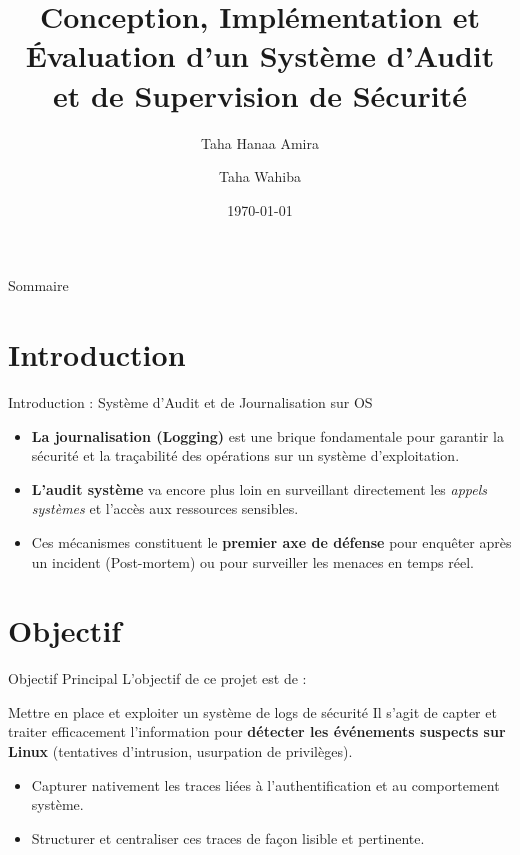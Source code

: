 \documentclass[10pt]{beamer}
\title[Système d'Audit et Journalisation]{Conception, Implémentation et Évaluation d'un Système d’Audit et de Supervision de Sécurité}
\author[Taha H.A. \& Taha W.]{Taha Hanaa Amira \and Taha Wahiba}
\institute[ING4 SECI]{ING4 SECI}
\date{\today}
\begin{document}
\begin{frame}
    \titlepage
\end{frame}

\begin{frame}{Sommaire}
    \tableofcontents
\end{frame}

\section{Introduction}
\begin{frame}{Introduction : Système d’Audit et de Journalisation sur OS}
    \begin{itemize}
        \item \textbf{La journalisation (Logging)} est une brique fondamentale pour garantir la sécurité et la traçabilité des opérations sur un système d'exploitation.
        \item \textbf{L'audit système} va encore plus loin en surveillant directement les \textit{appels systèmes} et l'accès aux ressources sensibles.
        \item Ces mécanismes constituent le \textbf{premier axe de défense} pour enquêter après un incident (Post-mortem) ou pour surveiller les menaces en temps réel.
    \end{itemize}
\end{frame}

\section{Objectif}
\begin{frame}{Objectif Principal}
    L'objectif de ce projet est de :
    \vspace{0.4cm}
    \begin{block}{Mettre en place et exploiter un système de logs de sécurité}
        Il s'agit de capter et traiter efficacement l'information pour \textbf{détecter les événements suspects sur Linux} (tentatives d'intrusion, usurpation de privilèges).
    \end{block}
    \vspace{0.4cm}
    \begin{itemize}
        \item Capturer nativement les traces liées à l'authentification et au comportement système.
        \item Structurer et centraliser ces traces de façon lisible et pertinente.
    \end{itemize}
\end{frame}
\end{document}
